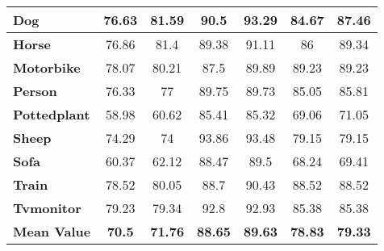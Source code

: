 \begin{table*}[t]
{\begin{tabular}{l|c|c|c|c|c|c}
	\textbf{Dog}         & 76.63          & 81.59           & 90.5            & 93.29          & 84.67           & 87.46          \\ \hline
	\textbf{Horse}       & 76.86          & 81.4            & 89.38           & 91.11          & 86              & 89.34          \\ \hline
	\textbf{Motorbike}   & 78.07          & 80.21           & 87.5            & 89.89          & 89.23           & 89.23          \\ \hline
	\textbf{Person}      & 76.33          & 77              & 89.75           & 89.73          & 85.05           & 85.81          \\ \hline
	\textbf{Pottedplant} & 58.98          & 60.62           & 85.41           & 85.32          & 69.06           & 71.05          \\ \hline
	\textbf{Sheep}       & 74.29          & 74              & 93.86           & 93.48          & 79.15           & 79.15          \\ \hline
	\textbf{Sofa}        & 60.37          & 62.12           & 88.47           & 89.5           & 68.24           & 69.41          \\ \hline
	\textbf{Train}       & 78.52          & 80.05           & 88.7            & 90.43          & 88.52           & 88.52          \\ \hline
	\textbf{Tvmonitor}   & 79.23          & 79.34           & 92.8            & 92.93          & 85.38           & 85.38          \\ \hline
	\textbf{Mean Value}  & \textbf{70.5}  & \textbf{71.76}  & \textbf{88.65}  & \textbf{89.63} & \textbf{78.83}  & \textbf{79.33} \\ \hline
\end{tabular}
	}
	\vspace{0.0cm}
	\caption[Detailed results on the Pascal VOC dataset]{\label{tbl:pascal_detailed}{\bf Pascal VOC dataset.} Detailed class-wise panoptic segmentation results on the Pascal VOC validation set comparing results without BCRF vs with BCRF on a standard network.}
	\vspace{0.5cm}
\end{table*}

